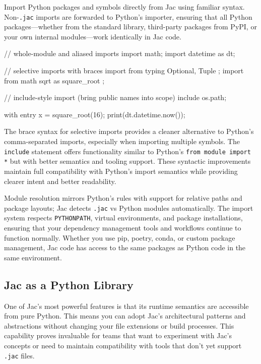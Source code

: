 Import Python packages and symbols directly from Jac using familiar syntax. Non-\texttt{.jac} imports are forwarded to Python's importer, ensuring that all Python packages—whether from the standard library, third-party packages from PyPI, or your own internal modules—work identically in Jac code.

\begin{jacblock}
// whole-module and aliased imports
import math;
import datetime as dt;

// selective imports with braces
import from typing { Optional, Tuple };
import from math { sqrt as square_root };

// include-style import (bring public names into scope)
include os.path;

with entry {
    x = square_root(16);
    print(dt.datetime.now());
}
\end{jacblock}

The brace syntax for selective imports provides a cleaner alternative to Python's comma-separated imports, especially when importing multiple symbols. The \texttt{include} statement offers functionality similar to Python's \texttt{from module import *} but with better semantics and tooling support. These syntactic improvements maintain full compatibility with Python's import semantics while providing clearer intent and better readability.

Module resolution mirrors Python's rules with support for relative paths and package layouts; Jac detects \texttt{.jac} vs Python modules automatically. The import system respects \texttt{PYTHONPATH}, virtual environments, and package installations, ensuring that your dependency management tools and workflows continue to function normally. Whether you use pip, poetry, conda, or custom package management, Jac code has access to the same packages as Python code in the same environment.

\subsection{Jac as a Python Library}

One of Jac's most powerful features is that its runtime semantics are accessible from pure Python. This means you can adopt Jac's architectural patterns and abstractions without changing your file extensions or build processes. This capability proves invaluable for teams that want to experiment with Jac's concepts or need to maintain compatibility with tools that don't yet support \texttt{.jac} files.

